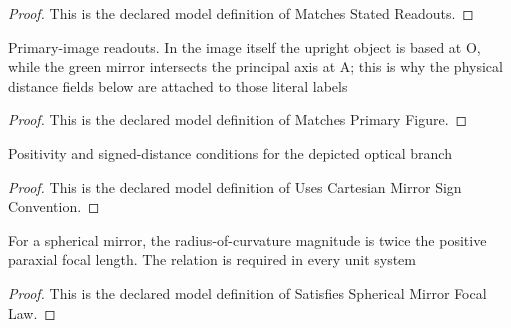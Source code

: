 \begin{proof}
  This is the declared model definition of Matches Stated Readouts.
\end{proof}
\begin{definition}
  \label{def:physics:phyx-mini-0140:phyxminiproblems-problemphyxmini0140-matchesprimaryfigure}
  Primary-image readouts. In the image itself the upright object is based at O, while the green mirror intersects the principal axis at A; this is why the physical distance fields below are attached to those literal labels
\end{definition}
\begin{proof}
  This is the declared model definition of Matches Primary Figure.
\end{proof}
\begin{definition}
  \label{def:physics:phyx-mini-0140:phyxminiproblems-problemphyxmini0140-usescartesianmirrorsignconvention}
  Positivity and signed-distance conditions for the depicted optical branch
\end{definition}
\begin{proof}
  This is the declared model definition of Uses Cartesian Mirror Sign Convention.
\end{proof}
\begin{definition}
  \label{def:physics:phyx-mini-0140:phyxminiproblems-problemphyxmini0140-satisfiessphericalmirrorfocallaw}
  For a spherical mirror, the radius-of-curvature magnitude is twice the positive paraxial focal length. The relation is required in every unit system
\end{definition}
\begin{proof}
  This is the declared model definition of Satisfies Spherical Mirror Focal Law.
\end{proof}
